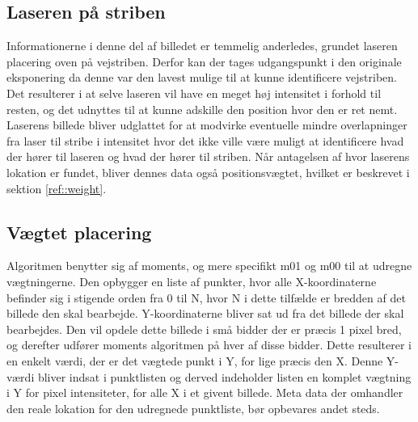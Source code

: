 \subsection{Laseren på striben}
Informationerne i denne del af billedet er temmelig anderledes, grundet laseren placering oven på vejstriben. Derfor kan der tages udgangspunkt i den originale eksponering da denne var den lavest mulige til at kunne identificere vejstriben. Det resulterer i at selve laseren vil have en meget høj intensitet i forhold til resten, og det udnyttes til at kunne adskille den position hvor den er ret nemt. Laserens billede bliver udglattet for at modvirke eventuelle mindre overlapninger fra laser til stribe i intensitet hvor det ikke ville være muligt at identificere hvad der hører til laseren og hvad der hører til striben. Når antagelsen af hvor laserens lokation er fundet, bliver dennes data også positionsvægtet, hvilket er beskrevet i sektion \ref{ref::weight}.

\subsection{Vægtet placering\label{ref::weight}}
Algoritmen benytter sig af moments, og mere specifikt m01 og m00 til at udregne vægtningerne.
Den opbygger en liste af punkter, hvor alle X-koordinaterne befinder sig i stigende orden fra 0 til N, hvor N i dette tilfælde er bredden af det billede den skal bearbejde.
Y-koordinaterne bliver sat ud fra det billede der skal bearbejdes. Den vil opdele dette billede i små bidder der er præcis 1 pixel bred, og derefter udfører moments algoritmen på hver af disse bidder. Dette resulterer i en enkelt værdi, der er det vægtede punkt i Y, for lige præcis den X. Denne Y-værdi bliver indsat i punktlisten og derved indeholder listen en komplet vægtning i Y for pixel intensiteter, for alle X i et givent billede. Meta data der omhandler den reale lokation for den udregnede punktliste, bør opbevares andet steds.
